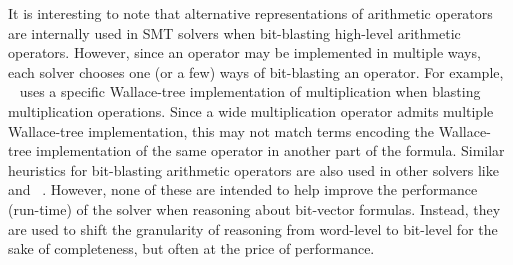 It is interesting to note that alternative representations of
arithmetic operators are internally used in SMT solvers when
bit-blasting high-level arithmetic operators.  However, since an
operator may be implemented in multiple ways, each solver chooses one
(or a few) ways of bit-blasting an operator.  For example,
{\zthree}~\cite{zthree} uses a specific Wallace-tree implementation of
multiplication when blasting multiplication operations.  Since a wide
multiplication operator admits multiple Wallace-tree implementation,
this may not match terms encoding the Wallace-tree implementation of
the same operator in another part of the formula.  Similar heuristics
for bit-blasting arithmetic operators are also used in other solvers
like {\boolector}~\cite{boolector} and {\cvcfour}~\cite{cvcfour}.
However, none of these are intended to help improve the performance
(run-time) of the solver when reasoning about bit-vector formulas.
Instead, they are used to shift the granularity of reasoning from
word-level to bit-level for the sake of completeness, but often
at the price of performance.


